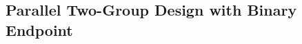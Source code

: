 \documentclass[12pt]{article}
\begin{document}
%
% 


\subsection{Parallel Two-Group Design with Binary Endpoint}\label{sec:example2}
\end{document}
